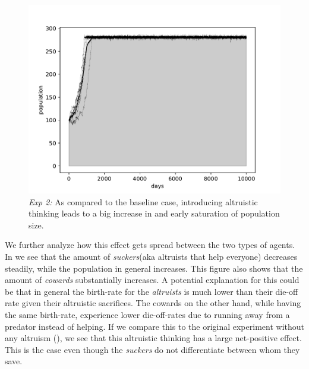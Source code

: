 \documentclass[sigconf]{acmart}
\newcommand{\cowards}{\textit{cowards}\xspace}
\newcommand{\altruists}{\textit{altruists}\xspace}
\newcommand{\suckers}{\textit{suckers}\xspace}
\begin{document}
    \begin{figure}
        \includegraphics[width=\columnwidth]{figures/exp2_total}
        \caption{\textit{Exp 2:} As compared to the baseline case, introducing altruistic thinking leads to a big increase in and early saturation of population size.
        }
        \label{fig:exp2_total}
    \end{figure}

    We further analyze how this effect gets spread between the two types of agents.
    In  we see that the amount of \suckers (aka altruists that help everyone) decreases steadily, while the population in general increases.
    This figure also shows that the amount of \cowards substantially increases.
    A potential explanation for this could be that in general the birth-rate for the \altruists is much lower than their die-off rate given their altruistic sacrifices.
    The cowards on the other hand, while having the same birth-rate, experience lower die-off-rates due to running away from a predator instead of helping.
    If we compare this to the original experiment without any altruism (), we see that this altruistic thinking has a large net-positive effect.
    This is the case even though the \suckers do not differentiate between whom they save.
\end{document}
